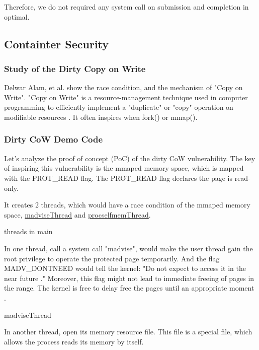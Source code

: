 \documentclass[12pt,a4paper]{article}
\begin{document}
Therefore, we do not required any system call on submission and completion in optimal.

\subsection{Containter Security}
\hypertarget{security}{}
\subsubsection{Study of the Dirty Copy on Write}
Delwar Alam, et al. \cite{Study_Dirty_Cow} show the race condition, and the mechanism of
"Copy on Write". "Copy on Write" is a resource-management technique used in
computer programming to efficiently implement a "duplicate" or "copy" operation
on modifiable resources \cite{CoW_wiki}. It often inspires when fork() or mmap().

\subsubsection{Dirty CoW Demo Code}
Let's analyze the proof of concept (PoC) of the dirty CoW \cite{Dirty_CoW} vulnerability.
The key of inspiring this vulnerability is the mmaped memory space, which is mapped with
the PROT\_READ flag. The PROT\_READ flag declares the page is read-only.


It creates 2 threads, which would have a race condition of the mmaped memory space,
\hyperlink{madvise}{madviseThread} and \hyperlink{procself}{procselfmemThread}.

\hypertarget{threads_main}{threads in main}


In one thread, call a system call "madvise", would make the user thread gain the root
privilege to operate the protected page temporarily. And the flag MADV\_DONTNEED would
tell the kernel: "Do not expect to access it in the near future \cite{Madvise}." Moreover,
this flag might not lead to immediate freeing of pages in the range. The kernel is free
to delay free the pages until an appropriate moment \cite{Madvise}.

\hypertarget{madvise}{madviseThread}


In another thread, open its memory resource file. This file is a special file, which allows
the process reads its memory by itself.\\
\end{document}
